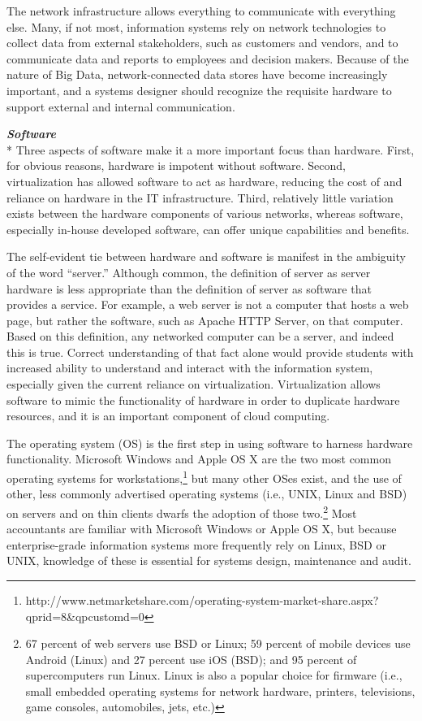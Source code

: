 \documentclass[12pt]{article}
\newcommand{\SubSubSection}[1]{{\centering{}\normalsize{}\textbf{\emph{#1}}}\\*\indent{}}
\begin{document}
The network infrastructure allows everything to communicate with everything else. Many, if not most, information systems rely on network technologies to collect data from external stakeholders, such as customers and vendors, and to communicate data and reports to employees and decision makers. Because of the nature of Big Data, network-connected data stores have become increasingly important, and a systems designer should recognize the requisite hardware to support external and internal communication.

\SubSubSection{Software}
Three aspects of software make it a more important focus than hardware. First, for obvious reasons, hardware is impotent without software. Second, virtualization has allowed software to act as hardware, reducing the cost of and reliance on hardware in the IT infrastructure. Third, relatively little variation exists between the hardware components of various networks, whereas software, especially in-house developed software, can offer unique capabilities and benefits.

The self-evident tie between hardware and software is manifest in the ambiguity of the word ``server.'' Although common, the definition of server as server hardware is less appropriate than the definition of server as software that provides a service. For example, a web server is not a computer that hosts a web page, but rather the software, such as Apache HTTP Server, on that computer. Based on this definition, any networked computer can be a server, and indeed this is true. Correct understanding of that fact alone would provide students with increased ability to understand and interact with the information system, especially given the current reliance on virtualization. Virtualization allows software to mimic the functionality of hardware in order to duplicate hardware resources, and it is an important component of cloud computing.

The operating system (OS) is the first step in using software to harness hardware functionality. Microsoft Windows and Apple OS X are the two most common operating systems for workstations,\footnote{http://www.netmarketshare.com/operating-system-market-share.aspx?qprid=8\&qpcustomd=0}  but many other OSes exist, and the use of other, less commonly advertised operating systems (i.e., UNIX, Linux and BSD) on servers and on thin clients dwarfs the adoption of those two.\footnote{67 percent of web servers use BSD or Linux; 59 percent of mobile devices use Android (Linux) and 27 percent use iOS (BSD); and 95 percent of supercomputers run Linux. Linux is also a popular choice for firmware (i.e., small embedded operating systems for network hardware, printers, televisions, game consoles, automobiles, jets, etc.)} Most accountants are familiar with Microsoft Windows or Apple OS X, but because enterprise-grade information systems more frequently rely on Linux, BSD or UNIX, knowledge of these is essential for systems design, maintenance and audit.
\end{document}
